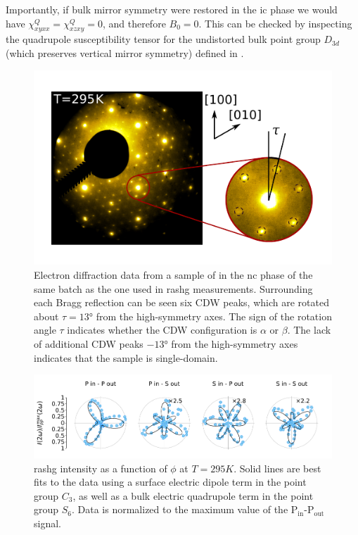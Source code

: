 Importantly, if bulk mirror symmetry were restored in the \gls{ic} phase we would have $\chi^Q_{xyxx} = \chi^Q_{xzxy} = 0$, and therefore $B_0=0$. 
This can be checked by inspecting the quadrupole susceptibility tensor for the undistorted bulk point group $D_{3d}$ (which preserves vertical mirror symmetry) defined in \citet{boyd}.
\begin{figure}
\centering
\includegraphics[width=\textwidth]{./gfx/ch5/diffraction.pdf}
\caption[Electron diffraction of \tastwo]{
\label{tastwo-fig:diffraction}
Electron diffraction data from a sample of \tastwo in the \gls{nc} phase of the same batch as the one used in \gls{rashg} measurements.
Surrounding each Bragg reflection can be seen six CDW peaks, which are rotated about $\tau=\ang{13}$ from the high-symmetry axes.
The sign of the rotation angle $\tau$ indicates whether the CDW configuration is $\alpha$ or $\beta$.
The lack of additional CDW peaks $\ang{-13}$ from the high-symmetry axes indicates that the sample is single-domain.
}
\end{figure}

\begin{figure}
\includegraphics[width=\textwidth]{./gfx/ch5/figS3.pdf}
\caption[Electric quadrupole RA-SHG in \tastwo ($T=\qty{295}{K}$)]{\label{tastwo-fig:295K}\gls{rashg} intensity as a function of $\phi$ at $T=295K$.
Solid lines are best fits to the data using a surface electric dipole term in the point group $C_3$, as well as a bulk electric quadrupole term in the point group $S_6$.
Data is normalized to the maximum value of the P$_\mathrm{in}$-P$_\mathrm{out}$ signal.}
\end{figure}

